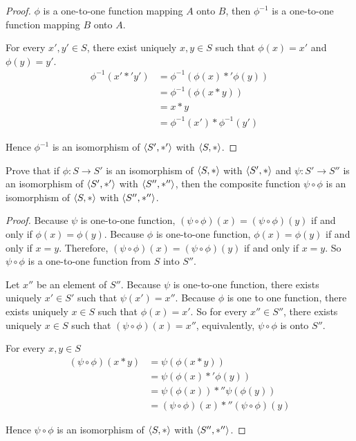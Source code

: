 \begin{proof}
    $\phi$ is a one-to-one function mapping $A$ onto $B$, then $\phi^{-1}$ is a one-to-one function mapping $B$ onto $A$.

    For every $x', y'\in S$, there exist uniquely $x, y\in S$ such that $\phi(x) = x'$ and $\phi(y) = y'$.
    \begin{align*}
        \phi^{-1}(x' *' y') & = \phi^{-1}(\phi(x) *' \phi(y)) \\
                            & = \phi^{-1}(\phi(x * y))        \\
                            & = x * y                         \\
                            & = \phi^{-1}(x') * \phi^{-1}(y')
    \end{align*}

    Hence $\phi^{-1}$ is an isomorphism of $\left\langle{S', *'}\right\rangle$ with $\left\langle{S, *}\right\rangle$.
\end{proof}

\begin{exercise}
    Prove that if $\phi: S \to S'$ is an isomorphism of $\left\langle{S, *}\right\rangle$ with $\left\langle{S', *}\right\rangle$ and $\psi: S' \to S''$ is an isomorphism of $\left\langle{S', *'}\right\rangle$ with $\left\langle{S'', *''}\right\rangle$, then the composite function $\psi\circ\phi$ is an isomorphism of $\left\langle{S, *}\right\rangle$ with $\left\langle{S'', *''}\right\rangle$.
\end{exercise}

\begin{proof}
    Because $\psi$ is one-to-one function, $(\psi\circ\phi)(x) = (\psi\circ\phi)(y)$ if and only if $\phi(x) = \phi(y)$. Because $\phi$ is one-to-one function, $\phi(x) = \phi(y)$ if and only if $x = y$. Therefore, $(\psi\circ\phi)(x) = (\psi\circ\phi)(y)$ if and only if $x = y$. So $\psi\circ\phi$ is a one-to-one function from $S$ into $S''$.

    Let $x''$ be an element of $S''$. Because $\psi$ is one-to-one function, there exists uniquely $x'\in S'$ such that $\psi(x') = x''$. Because $\phi$ is one to one function, there exists uniquely $x\in S$ such that $\phi(x) = x'$. So for every $x''\in S''$, there exists uniquely $x\in S$ such that $(\psi\circ\phi)(x) = x''$, equivalently, $\psi\circ\phi$ is onto $S''$.

    For every $x, y\in S$
    \begin{align*}
        (\psi\circ\phi)(x * y) & = \psi(\phi(x * y))                         \\
                               & = \psi(\phi(x) *' \phi(y))                  \\
                               & = \psi(\phi(x)) *'' \psi(\phi(y))           \\
                               & = (\psi\circ\phi)(x) *'' (\psi\circ\phi)(y)
    \end{align*}

    Hence $\psi\circ\phi$ is an isomorphism of $\left\langle{S, *}\right\rangle$ with $\left\langle{S'', *''}\right\rangle$.
\end{proof}

